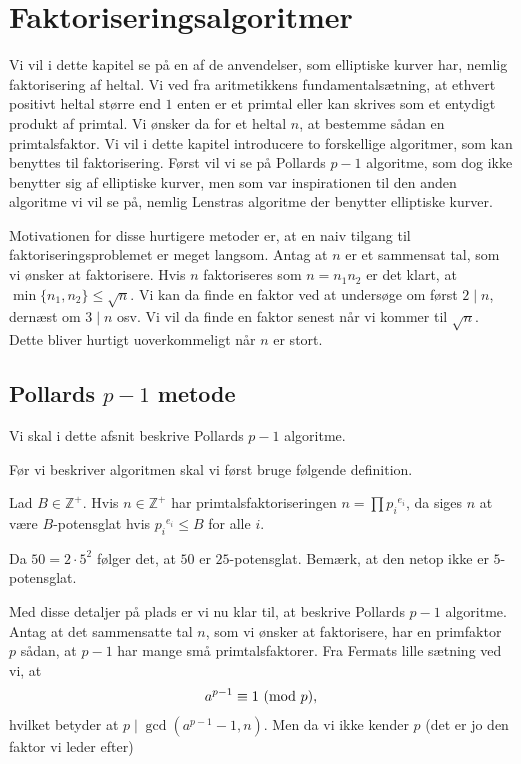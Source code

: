 \chapter{Faktoriseringsalgoritmer}
Vi vil i dette kapitel se på en af de anvendelser, som elliptiske kurver har, nemlig faktorisering af heltal. Vi ved fra aritmetikkens fundamentalsætning, at ethvert positivt heltal større end $1$ enten er et primtal eller kan skrives som et entydigt produkt af primtal. Vi ønsker da for et heltal $n$, at bestemme sådan en primtalsfaktor. Vi vil i dette kapitel introducere to forskellige algoritmer, som kan benyttes til faktorisering. Først vil vi se på Pollards $p-1$ algoritme, som dog ikke benytter sig af elliptiske kurver, men som var inspirationen til den anden algoritme vi vil se på, nemlig Lenstras algoritme der benytter elliptiske kurver.

Motivationen for disse hurtigere metoder er, at en naiv tilgang til faktoriseringsproblemet er meget langsom. Antag at $n$ er et sammensat tal, som vi 
ønsker at faktorisere. Hvis $n$ faktoriseres som $n=n_1 n_2$ er 
det klart, at $\min \{n_1, n_2 \} \leq \sqrt{n}$. Vi kan da finde
en faktor ved at undersøge om først $2 \mid n$, dernæst om 
$3 \mid n$ osv. Vi vil da finde en faktor senest når vi kommer
til $\sqrt{n}$. Dette bliver hurtigt uoverkommeligt når $n$ er stort.

\section{Pollards $p-1$ metode}
Vi skal i dette afsnit beskrive Pollards $p-1$ algoritme.





Før vi beskriver algoritmen skal vi først bruge følgende 
definition.

\begin{definition}[$B$-potensglat]
Lad $B \in \mathbb{Z}^{+}$. Hvis $n \in \mathbb{Z}^{+}$ har 
primtalsfaktoriseringen $n = \prod {p_i}^{e_i}$, da siges $n$ 
at være $B$-potensglat hvis ${p_i}^{e_i} \leq B$ for alle $i$.
\end{definition}

\begin{example}
Da $50 = 2 \cdot 5^2$ følger det, at $50$ er $25$-potensglat. 
Bemærk, at den netop ikke er $5$-potensglat.
\end{example}

Med disse detaljer på plads er vi nu klar til, at beskrive Pollards
$p-1$ algoritme. Antag at det sammensatte tal $n$, som vi ønsker at
faktorisere, har en primfaktor $p$ sådan, at $p-1$ har mange små
primtalsfaktorer. Fra Fermats lille sætning ved vi, at 
\begin{align*}
	a^{p-1} \equiv 1 \ (\mathrm{mod} \ p),
\end{align*}
hvilket betyder at $p \mid \gcd(a^{p-1} - 1, n)$. Men da vi ikke kender
$p$ (det er jo den faktor vi leder efter)


